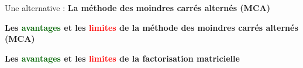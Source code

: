 \begin{frame}{\PartieI}
    \begin{center}
        \large{Une alternative : \textbf{La méthode des moindres carrés alternés (MCA)}}
    \end{center}
\end{frame}

\begin{frame}{\PartieI}
    \begin{center}
        \textbf{\large{Les \textcolor{darkgreen}{avantages} et les \textcolor{red}{limites} de la méthode des moindres carrés alternés (MCA)}}
    \end{center}
\end{frame}

\begin{frame}{\PartieI}
    \begin{center}
        \textbf{\large{Les \textcolor{darkgreen}{avantages} et les \textcolor{red}{limites} de la factorisation matricielle}}
    \end{center}
\end{frame}